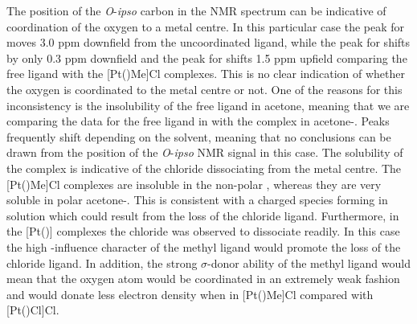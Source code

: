 The position of the \emph{O}-\emph{ipso} carbon in the \carbon{} NMR spectrum can be indicative of coordination of the oxygen to a metal centre.  In this particular case the peak for \tBusixantphos{} moves 3.0 ppm downfield from the uncoordinated ligand, while the peak for \tBuxantphos{} shifts by only 0.3 ppm downfield and the peak for \tButhixantphos{} shifts 1.5 ppm upfield comparing the free ligand with the [Pt(\tBuxantphos)Me]Cl complexes.  This is no clear indication of whether the oxygen is coordinated to the metal centre or not.  One of the reasons for this inconsistency is the insolubility of the free ligand in acetone, meaning that we are comparing the data for the free ligand in  with the complex in acetone-.  Peaks frequently shift depending on the solvent, meaning that no  conclusions can be drawn from the position of the \emph{O}-\emph{ipso} \carbon{} NMR signal in this case.  The solubility of the complex is indicative of the chloride dissociating from the metal centre.  The [Pt(\tBuxantphos)Me]Cl complexes are insoluble in the non-polar , whereas they are very soluble in polar acetone-.  This is consistent with a charged species forming in solution which could result from the loss of the chloride ligand.  Furthermore, in the [Pt(\tBuxantphos)] complexes the chloride was observed to dissociate readily.  In this case the high \trans-influence character of the methyl ligand would promote the loss of the chloride ligand.  In addition, the strong $\sigma$-donor ability of the methyl ligand would mean that the oxygen atom would be coordinated in an extremely weak fashion and would donate less electron density when in [Pt(\tBuxantphos)Me]Cl compared with [Pt(\tBuxantphos)Cl]Cl.  

